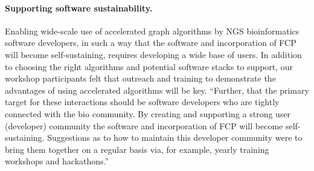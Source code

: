 \paragraph{Supporting software sustainability.} Enabling wide-scale use of accelerated graph algorithms by NGS bioinformatics software developers, in such a way that the software and incorporation of FCP will become self-sustaining, requires developing a wide base of users. In addition to choosing the right algorithms and potential software stacks to support, our workshop participants felt that outreach and training to demonstrate the advantages of using accelerated algorithms will be key. ``Further, that the primary target for these interactions should be software developers who are tightly connected with the bio community. By creating and supporting a strong user (developer) community the software and incorporation of FCP will become self-sustaining. Suggestions as to how to maintain this developer community were to bring them together on a regular basis via, for example, yearly training workshops and hackathons.” \cite{wiki}

